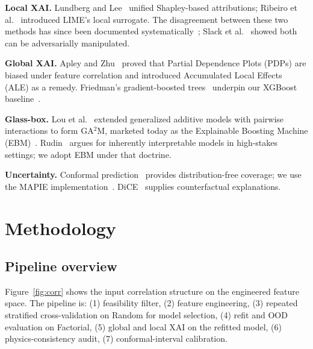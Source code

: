 \documentclass[conference]{IEEEtran}
\begin{document}
\textbf{Local XAI.} Lundberg and Lee~\cite{lundberg2017} unified Shapley-based attributions; Ribeiro et al.~\cite{ribeiro2016} introduced LIME's local surrogate. The disagreement between these two methods has since been documented systematically~\cite{krishna2022,salih2024}; Slack et al.~\cite{slack2020fooling} showed both can be adversarially manipulated.

\textbf{Global XAI.} Apley and Zhu~\cite{apley2020} proved that Partial Dependence Plots (PDPs) are biased under feature correlation and introduced Accumulated Local Effects (ALE) as a remedy. Friedman's gradient-boosted trees~\cite{friedman2001} underpin our XGBoost baseline~\cite{chen2016}.

\textbf{Glass-box.} Lou et al.~\cite{lou2013} extended generalized additive models with pairwise interactions to form GA$^2$M, marketed today as the Explainable Boosting Machine (EBM)~\cite{caruana2015}. Rudin~\cite{rudin2019} argues for inherently interpretable models in high-stakes settings; we adopt EBM under that doctrine.

\textbf{Uncertainty.} Conformal prediction~\cite{vovk2005,angelopoulos2021} provides distribution-free coverage; we use the MAPIE implementation~\cite{mapie2022}. DiCE~\cite{mothilal2020} supplies counterfactual explanations.

\section{Methodology}
\label{sec:method}

\subsection{Pipeline overview}
Figure~\ref{fig:corr} shows the input correlation structure on the engineered feature space. The pipeline is: (1) feasibility filter, (2) feature engineering, (3) repeated stratified cross-validation on Random for model selection, (4) refit and OOD evaluation on Factorial, (5) global and local XAI on the refitted model, (6) physics-consistency audit, (7) conformal-interval calibration.
\end{document}
